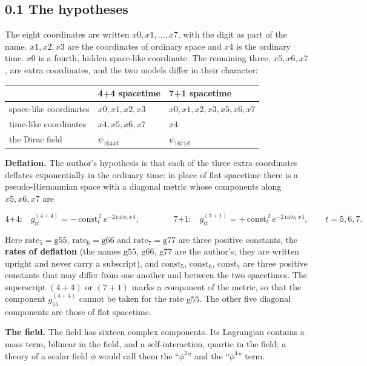 \documentclass[
  10pt,
]{article}
\begin{document}
\hypertarget{the-hypotheses}{%
\subsection{0.1 The hypotheses}\label{the-hypotheses}}

The eight coordinates are written \(x0,x1,\dots,x7\), with the digit as
part of the name. \(x1,x2,x3\) are the coordinates of ordinary space and
\(x4\) is the ordinary time. \(x0\) is a fourth, hidden space-like
coordinate. The remaining three, \(x5,x6,x7\), are extra coordinates,
and the two models differ in their character:

\begin{longtable}[]{@{}lll@{}}
\toprule\noalign{}
& 4+4 spacetime & 7+1 spacetime \\
\midrule\noalign{}
\endhead
\bottomrule\noalign{}
\endlastfoot
space-like coordinates & \(x0,x1,x2,x3\) & \(x0,x1,x2,x3,x5,x6,x7\) \\
time-like coordinates & \(x4,x5,x6,x7\) & \(x4\) \\
the Dirac field & \(\psi_{1644d}\) & \(\psi_{1671d}\) \\
\end{longtable}

\textbf{Deflation.} The author's hypothesis is that each of the three
extra coordinates deflates exponentially in the ordinary time: in place
of flat spacetime there is a pseudo-Riemannian space with a diagonal
metric whose components along \(x5,x6,x7\) are

\[\text{4+4:}\quad g^{(4+4)}_{tt}=-\,\mathrm{const}_t^{\,2}\,e^{-2\,\mathrm{rate}_t\,x4},\qquad\qquad
\text{7+1:}\quad g^{(7+1)}_{tt}=+\,\mathrm{const}_t^{\,2}\,e^{-2\,\mathrm{rate}_t\,x4},\qquad t=5,6,7.\tag{0.1}\]

Here \(\mathrm{rate}_5=\mathrm{g55}\), \(\mathrm{rate}_6=\mathrm{g66}\)
and \(\mathrm{rate}_7=\mathrm{g77}\) are three positive constants, the
\textbf{rates of deflation} (the names \(\mathrm{g55}\),
\(\mathrm{g66}\), \(\mathrm{g77}\) are the author's; they are written
upright and never carry a subscript), and \(\mathrm{const}_5\),
\(\mathrm{const}_6\), \(\mathrm{const}_7\) are three positive constants
that may differ from one another and between the two spacetimes. The
superscript \((4+4)\) or \((7+1)\) marks a component of the metric, so
that the component \(g^{(4+4)}_{55}\) cannot be taken for the rate
\(\mathrm{g55}\). The other five diagonal components are those of flat
spacetime.

\textbf{The field.} The field has sixteen complex components. Its
Lagrangian contains a mass term, bilinear in the field, and a
self-interaction, quartic in the field; a theory of a scalar field
\(\phi\) would call them the ``\(\phi^2\)'' and the ``\(\phi^4\)'' term.
\end{document}
